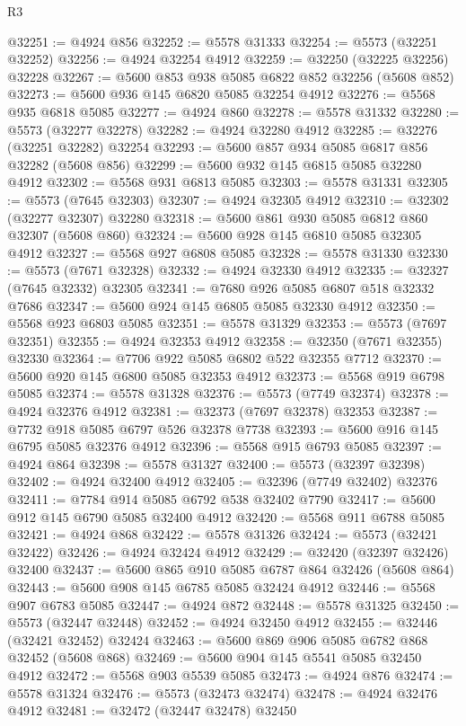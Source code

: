 \begin{lexlean}{R3}
\begin{coremodule}
@32251 := @4924 @856
@32252 := @5578 @31333
@32254 := @5573 (@32251 @32252)
@32256 := @4924 @32254 @4912
@32259 := @32250 (@32225 @32256) @32228
@32267 := @5600 @853 @938 @5085 @6822 @852 @32256 (@5608 @852)
@32273 := @5600 @936 @145 @6820 @5085 @32254 @4912
@32276 := @5568 @935 @6818 @5085
@32277 := @4924 @860
@32278 := @5578 @31332
@32280 := @5573 (@32277 @32278)
@32282 := @4924 @32280 @4912
@32285 := @32276 (@32251 @32282) @32254
@32293 := @5600 @857 @934 @5085 @6817 @856 @32282 (@5608 @856)
@32299 := @5600 @932 @145 @6815 @5085 @32280 @4912
@32302 := @5568 @931 @6813 @5085
@32303 := @5578 @31331
@32305 := @5573 (@7645 @32303)
@32307 := @4924 @32305 @4912
@32310 := @32302 (@32277 @32307) @32280
@32318 := @5600 @861 @930 @5085 @6812 @860 @32307 (@5608 @860)
@32324 := @5600 @928 @145 @6810 @5085 @32305 @4912
@32327 := @5568 @927 @6808 @5085
@32328 := @5578 @31330
@32330 := @5573 (@7671 @32328)
@32332 := @4924 @32330 @4912
@32335 := @32327 (@7645 @32332) @32305
@32341 := @7680 @926 @5085 @6807 @518 @32332 @7686
@32347 := @5600 @924 @145 @6805 @5085 @32330 @4912
@32350 := @5568 @923 @6803 @5085
@32351 := @5578 @31329
@32353 := @5573 (@7697 @32351)
@32355 := @4924 @32353 @4912
@32358 := @32350 (@7671 @32355) @32330
@32364 := @7706 @922 @5085 @6802 @522 @32355 @7712
@32370 := @5600 @920 @145 @6800 @5085 @32353 @4912
@32373 := @5568 @919 @6798 @5085
@32374 := @5578 @31328
@32376 := @5573 (@7749 @32374)
@32378 := @4924 @32376 @4912
@32381 := @32373 (@7697 @32378) @32353
@32387 := @7732 @918 @5085 @6797 @526 @32378 @7738
@32393 := @5600 @916 @145 @6795 @5085 @32376 @4912
@32396 := @5568 @915 @6793 @5085
@32397 := @4924 @864
@32398 := @5578 @31327
@32400 := @5573 (@32397 @32398)
@32402 := @4924 @32400 @4912
@32405 := @32396 (@7749 @32402) @32376
@32411 := @7784 @914 @5085 @6792 @538 @32402 @7790
@32417 := @5600 @912 @145 @6790 @5085 @32400 @4912
@32420 := @5568 @911 @6788 @5085
@32421 := @4924 @868
@32422 := @5578 @31326
@32424 := @5573 (@32421 @32422)
@32426 := @4924 @32424 @4912
@32429 := @32420 (@32397 @32426) @32400
@32437 := @5600 @865 @910 @5085 @6787 @864 @32426 (@5608 @864)
@32443 := @5600 @908 @145 @6785 @5085 @32424 @4912
@32446 := @5568 @907 @6783 @5085
@32447 := @4924 @872
@32448 := @5578 @31325
@32450 := @5573 (@32447 @32448)
@32452 := @4924 @32450 @4912
@32455 := @32446 (@32421 @32452) @32424
@32463 := @5600 @869 @906 @5085 @6782 @868 @32452 (@5608 @868)
@32469 := @5600 @904 @145 @5541 @5085 @32450 @4912
@32472 := @5568 @903 @5539 @5085
@32473 := @4924 @876
@32474 := @5578 @31324
@32476 := @5573 (@32473 @32474)
@32478 := @4924 @32476 @4912
@32481 := @32472 (@32447 @32478) @32450

\end{coremodule}
\end{lexlean}
